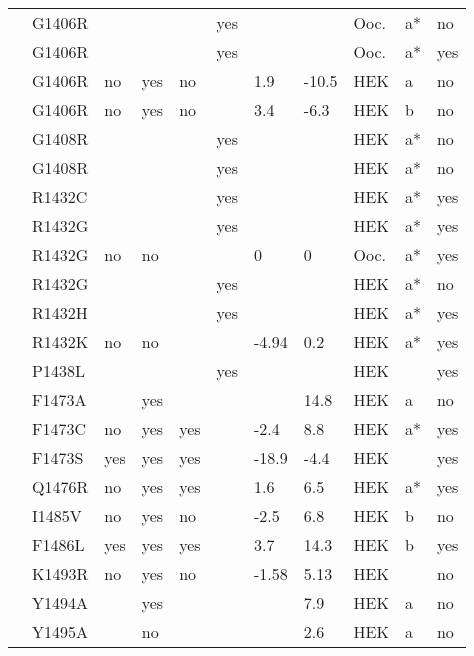 \begin{tiny}
\begin{longtable}{p{4cm}|l|llll|ll|lll}
\citet{Kyndt2001MutationDB} & G1406R &  &  &  & yes &  &  & Ooc. & a* & no \\
\citet{Kyndt2001MutationDB} & G1406R &  &  &  & yes &  &  & Ooc. & a* & yes \\
\citet{Tan2006MutationDB} & G1406R & no & yes & no &  & 1.9 & -10.5 & HEK & a & no \\
\citet{Tan2006MutationDB} & G1406R & no & yes & no &  & 3.4 & -6.3 & HEK & b & no \\
\citet{Gui2010aMutationDB} & G1408R &  &  &  & yes &  &  & HEK & a* & no \\
\citet{Gui2010bMutationDB} & G1408R &  &  &  & yes &  &  & HEK & a* & no \\
\citet{Baroudi2001MutationDB} & R1432C &  &  &  & yes &  &  & HEK & a* & yes \\
\citet{Baroudi2001MutationDB} & R1432G &  &  &  & yes &  &  & HEK & a* & yes \\
\citet{Baroudi2001MutationDB} & R1432G & no & no &  &  & 0 & 0 & Ooc. & a* & yes \\
\citet{Deschenes2000MutationDB} & R1432G &  &  &  & yes &  &  & HEK & a* & no \\
\citet{Baroudi2001MutationDB} & R1432H &  &  &  & yes &  &  & HEK & a* & yes \\
\citet{Baroudi2001MutationDB} & R1432K & no & no &  &  & -4.94 & 0.2 & HEK & a* & yes \\
\citet{Six2008MutationDB} & P1438L &  &  &  & yes &  &  & HEK &  & yes \\
\citet{Sarhan2009MutationDB} & F1473A &  & yes &  &  &  & 14.8 & HEK & a & no \\
\citet{Bankston2007bMutationDB} & F1473C & no & yes & yes &  & -2.4 & 8.8 & HEK & a* & yes \\
\citet{Ruan2010MutationDB} & F1473S & yes & yes & yes &  & -18.9 & -4.4 & HEK &  & yes \\
\citet{Moreau2013MutationDB} & Q1476R & no & yes & yes &  & 1.6 & 6.5 & HEK & a* & yes \\
\citet{Kapplinger2015MutationDB} & I1485V & no & yes & no &  & -2.5 & 6.8 & HEK & b & no \\
\citet{Wang2007aMutationDB} & F1486L & yes & yes & yes &  & 3.7 & 14.3 & HEK & b & yes \\
\citet{Li2009MutationDB} & K1493R & no & yes & no &  & -1.58 & 5.13 & HEK &  & no \\
\citet{Sarhan2009MutationDB} & Y1494A &  & yes &  &  &  & 7.9 & HEK & a & no \\
\citet{Sarhan2009MutationDB} & Y1495A &  & no &  &  &  & 2.6 & HEK & a & no \\

\end{longtable}
\end{tiny}
